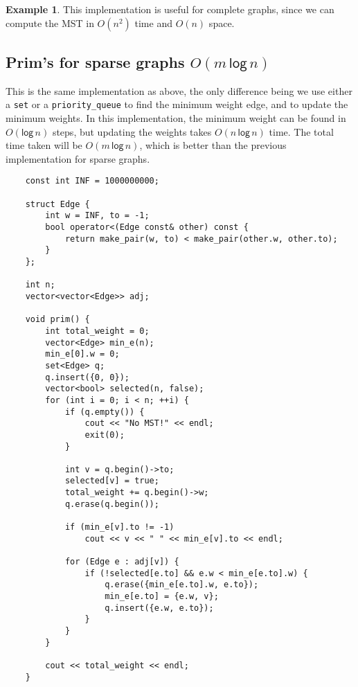 \documentclass[12pt,a4paper]{amsart}
\numberwithin{equation}{section}
\theoremstyle{definition}
\newtheorem{Ex}{Example}[section]
\begin{document}
\begin{Ex}
    This implementation is useful for complete graphs, since we can compute the MST in $O(n^2)$ time and $O(n)$ space.
\end{Ex}

\subsection{Prim's for sparse graphs $O(m\,\mathsf{log\,}n)$} This is the same implementation as above, the only difference being we use either a \verb|set| or a \verb|priority_queue| to find the minimum weight edge, and to update the minimum weights. In this implementation, the minimum weight can be found in $O(\mathsf{log\,}n)$ steps, but updating the weights takes $O(n\,\mathsf{log\,}n)$ time. The total time taken will be $O(m\mathsf{\,log\,}n)$, which is better than the previous implementation for sparse graphs. 

\begin{lstlisting}
    const int INF = 1000000000;

    struct Edge {
        int w = INF, to = -1;
        bool operator<(Edge const& other) const {
            return make_pair(w, to) < make_pair(other.w, other.to);
        }
    };

    int n;
    vector<vector<Edge>> adj;

    void prim() {
        int total_weight = 0;
        vector<Edge> min_e(n);
        min_e[0].w = 0;
        set<Edge> q;
        q.insert({0, 0});
        vector<bool> selected(n, false);
        for (int i = 0; i < n; ++i) {
            if (q.empty()) {
                cout << "No MST!" << endl;
                exit(0);
            }

            int v = q.begin()->to;
            selected[v] = true;
            total_weight += q.begin()->w;
            q.erase(q.begin());

            if (min_e[v].to != -1)
                cout << v << " " << min_e[v].to << endl;

            for (Edge e : adj[v]) {
                if (!selected[e.to] && e.w < min_e[e.to].w) {
                    q.erase({min_e[e.to].w, e.to});
                    min_e[e.to] = {e.w, v};
                    q.insert({e.w, e.to});
                }
            }
        }

        cout << total_weight << endl;
    }
\end{lstlisting}
\end{document}
